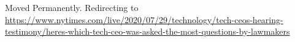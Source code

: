 Moved Permanently. Redirecting to
\url{https://www.nytimes.com/live/2020/07/29/technology/tech-ceos-hearing-testimony/heres-which-tech-ceo-was-asked-the-most-questions-by-lawmakers}
